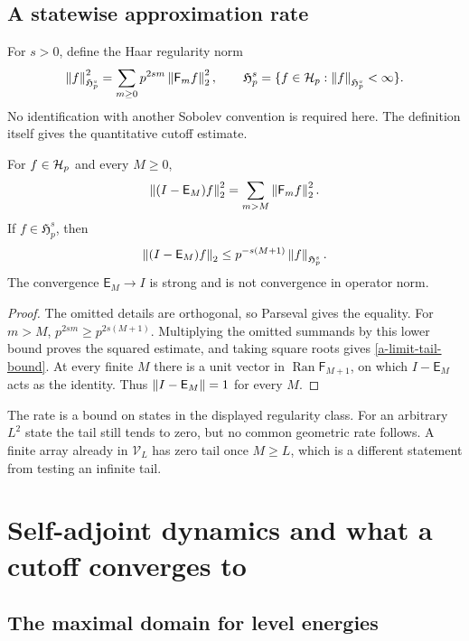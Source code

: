 \subsection{A statewise approximation rate}

For $s>0$, define the Haar regularity norm
\[
 \left\lVert f\right\rVert_{\mathfrak H_p^s}^2
 =\sum_{m\geq0}p^{2sm}\left\lVert\mathsf F_mf\right\rVert_2^2,
 \qquad
 \mathfrak H_p^s=\{f\in\mathcal H_p:\left\lVert f\right\rVert_{\mathfrak H_p^s}<\infty\}.
\]
No identification with another Sobolev convention is required here.
The definition itself gives the quantitative cutoff estimate.

\begin{proposition}
\label{a-limit-tail}
For $f\in\mathcal H_p$ and every $M\geq0$,
\begin{equation}
 \left\lVert(I-\mathsf E_M)f\right\rVert_2^2
 =\sum_{m>M}\left\lVert\mathsf F_mf\right\rVert_2^2.
 \label{a-limit-tail-identity}
\end{equation}
If $f\in\mathfrak H_p^s$, then
\begin{equation}
 \left\lVert(I-\mathsf E_M)f\right\rVert_2
 \leq p^{-s(M+1)}\left\lVert f\right\rVert_{\mathfrak H_p^s}.
 \label{a-limit-tail-bound}
\end{equation}
The convergence $\mathsf E_M\to I$ is strong and is not convergence in
operator norm.
\end{proposition}
\begin{proof}
The omitted details are orthogonal, so Parseval gives the equality.
For $m>M$, $p^{2sm}\geq p^{2s(M+1)}$. Multiplying the omitted summands
by this lower bound proves the squared estimate, and taking square roots
gives \eqref{a-limit-tail-bound}. At every finite $M$ there is a unit
vector in $\operatorname{Ran}\mathsf F_{M+1}$, on which
$I-\mathsf E_M$ acts as the identity. Thus
$\left\lVert I-\mathsf E_M\right\rVert=1$ for every $M$.
\end{proof}

The rate is a bound on states in the displayed regularity class. For an
arbitrary $L^2$ state the tail still tends to zero, but no common geometric
rate follows. A finite array already in $\mathcal V_L$ has zero tail once
$M\geq L$, which is a different statement from testing an infinite tail.


\section{Self-adjoint dynamics and what a cutoff converges to}
\label{a-limit-dynamics}

\subsection{The maximal domain for level energies}

